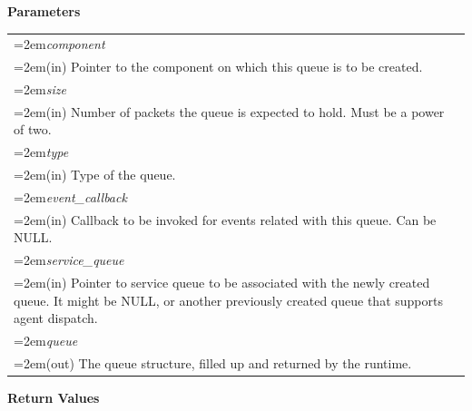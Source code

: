 \documentclass[final]{book}
\newcommand{\hsaarg}[1]{\textit{#1}}
\begin{document}
\noindent\textbf{Parameters}\\[-6mm]
\noindent\begin{longtable}{@{}>{\hangindent=2em}p{\textwidth}}
\hsaarg{component}\\\hspace{2em}(in) Pointer to the component on which this queue is to be created.\\[2mm]
\hsaarg{size}\\\hspace{2em}(in) Number of packets the queue is expected to hold. Must be a power of two.\\[2mm]
\hsaarg{type}\\\hspace{2em}(in) Type of the queue.\\[2mm]
\hsaarg{event_callback}\\\hspace{2em}(in) Callback to be invoked for events related with this queue. Can be NULL.\\[2mm]
\hsaarg{service_queue}\\\hspace{2em}(in) Pointer to service queue to be associated with the newly created queue. It might be NULL, or another previously created queue that supports agent dispatch.\\[2mm]
\hsaarg{queue}\\\hspace{2em}(out) The queue structure, filled up and returned by the runtime.
\end{longtable}
\vspace{-5mm}\noindent\textbf{Return Values}\\[-6mm]
\end{document}

